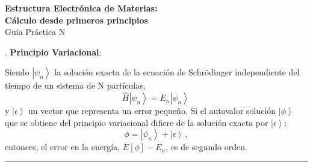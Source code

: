 \documentclass[10pt]{article}
\begin{document}

\begin{center}
 {\large \bf Estructura Electrónica de Materias: \\
 Cálculo desde primeros principios} \\
 
 \vspace{0.25cm}
 Guía Práctica N
\end{center}

\vspace{0.5cm}
. {\bf Principio Variacional}:

\vspace{0.25cm}
Siendo $\left|\psi_n\right>$ la solución exacta de la ecuación de Schr\"odinger
independiente del tiempo de un sistema de N partículas,
\begin{equation}
 \hat{H}\left|\psi_n\right> = E_n\left|\psi_n\right>\,
\end{equation}
y $\left|\epsilon\right>$ un vector que representa un error pequeño.
Si el autovalor solución $\left|\phi\right>$ que se obtiene del 
principio variacional difiere de la solución exacta por $\left|\epsilon\right>$: 
\begin{equation}
 \phi=\left|\psi_n\right>+\left|\epsilon\right>\,,
\end{equation}
entonces, el error en la energía, $E[\phi]-E_n$, es de segundo orden.

\begin{center}
 \noindent\rule[0.5ex]{0.9\linewidth}{0.1pt}
\end{center}
\end{document}
